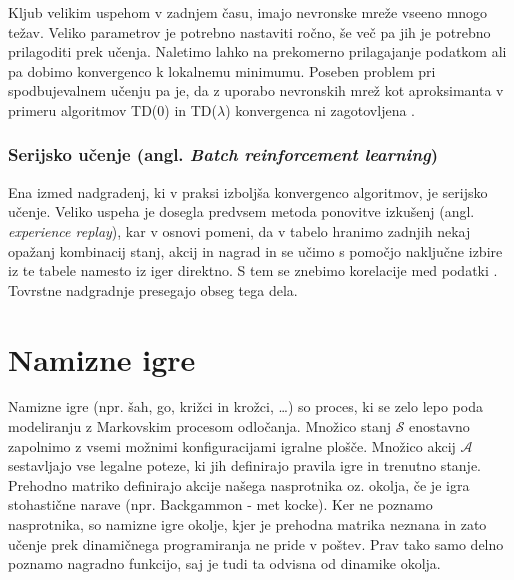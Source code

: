\documentclass[12pt,a4paper]{amsart}
\theoremstyle{definition} %
\theoremstyle{plain} %
\begin{document}
Kljub velikim uspehom v zadnjem času, imajo nevronske mreže vseeno mnogo težav. Veliko parametrov je 
potrebno nastaviti ročno, še več pa jih je potrebno prilagoditi prek učenja. Naletimo lahko na 
prekomerno prilagajanje podatkom ali pa dobimo konvergenco k lokalnemu minimumu.
Poseben problem pri spodbujevalnem učenju pa je, da z uporabo nevronskih mrež kot aproksimanta 
v primeru algoritmov TD($0$) in TD($\lambda$) konvergenca ni zagotovljena \cite{RLintro}.

\subsubsection{Serijsko učenje (angl. \textit{Batch reinforcement learning})}
Ena izmed nadgradenj, ki v praksi izboljša konvergenco algoritmov, je serijsko učenje. Veliko uspeha 
je dosegla predvsem metoda ponovitve izkušenj (angl. \textit{experience replay}), kar v osnovi pomeni, 
da v tabelo hranimo zadnjih nekaj opažanj kombinacij stanj, akcij in nagrad in se učimo s pomočjo 
naključne izbire iz te tabele namesto iz iger direktno. S tem se znebimo korelacije med podatki 
\cite{LecNotesSilver}. Tovrstne nadgradnje presegajo obseg tega dela.

\section{Namizne igre}\label{nm}
Namizne igre (npr. šah, go, križci in krožci, \dots) so proces, ki se zelo lepo poda modeliranju z 
Markovskim procesom odločanja. Množico stanj $\mathcal{S}$ enostavno zapolnimo z vsemi možnimi 
konfiguracijami igralne plošče. Množico akcij $\mathcal{A}$ sestavljajo vse legalne poteze, ki jih 
definirajo pravila igre in trenutno stanje. Prehodno matriko definirajo akcije našega nasprotnika oz. 
okolja, če je igra stohastične narave (npr. Backgammon - met kocke). Ker ne poznamo nasprotnika, so 
namizne igre okolje, kjer je prehodna matrika neznana in zato učenje prek dinamičnega programiranja 
ne pride v poštev. Prav tako samo delno poznamo nagradno funkcijo, saj je tudi ta odvisna od dinamike 
okolja.  
\end{document}
